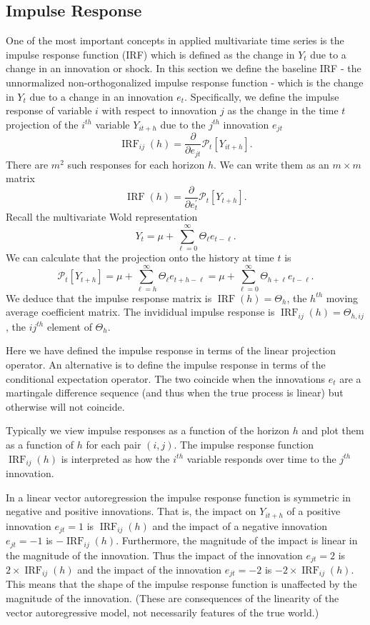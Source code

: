 \documentclass[10pt]{article}
\begin{document}
\subsection{Impulse Response}
One of the most important concepts in applied multivariate time series is the impulse response function (IRF) which is defined as the change in $Y_{t}$ due to a change in an innovation or shock. In this section we define the baseline IRF - the unnormalized non-orthogonalized impulse response function - which is the change in $Y_{t}$ due to a change in an innovation $e_{t}$. Specifically, we define the impulse response of variable $i$ with respect to innovation $j$ as the change in the time $t$ projection of the $i^{t h}$ variable $Y_{i t+h}$ due to the $j^{t h}$ innovation $e_{j t}$
$$
\operatorname{IRF}_{i j}(h)=\frac{\partial}{\partial e_{j t}} \mathscr{P}_{t}\left[Y_{i t+h}\right] .
$$
There are $m^{2}$ such responses for each horizon $h$. We can write them as an $m \times m$ matrix
$$
\operatorname{IRF}(h)=\frac{\partial}{\partial e_{t}^{\prime}} \mathscr{P}_{t}\left[Y_{t+h}\right] .
$$
Recall the multivariate Wold representation
$$
Y_{t}=\mu+\sum_{\ell=0}^{\infty} \Theta_{\ell} e_{t-\ell} .
$$
We can calculate that the projection onto the history at time $t$ is
$$
\mathscr{P}_{t}\left[Y_{t+h}\right]=\mu+\sum_{\ell=h}^{\infty} \Theta_{\ell} e_{t+h-\ell}=\mu+\sum_{\ell=0}^{\infty} \Theta_{h+\ell} e_{t-\ell} .
$$
We deduce that the impulse response matrix is $\operatorname{IRF}(h)=\Theta_{h}$, the $h^{t h}$ moving average coefficient matrix. The invididual impulse response is $\operatorname{IRF}_{i j}(h)=\Theta_{h, i j}$, the $i j^{t h}$ element of $\Theta_{h}$.

Here we have defined the impulse response in terms of the linear projection operator. An alternative is to define the impulse response in terms of the conditional expectation operator. The two coincide when the innovations $e_{t}$ are a martingale difference sequence (and thus when the true process is linear) but otherwise will not coincide.

Typically we view impulse responses as a function of the horizon $h$ and plot them as a function of $h$ for each pair $(i, j)$. The impulse response function $\operatorname{IRF}_{i j}(h)$ is interpreted as how the $i^{t h}$ variable responds over time to the $j^{t h}$ innovation.

In a linear vector autoregression the impulse response function is symmetric in negative and positive innovations. That is, the impact on $Y_{i t+h}$ of a positive innovation $e_{j t}=1$ is $\operatorname{IRF}_{i j}(h)$ and the impact of a negative innovation $e_{j t}=-1$ is $-\operatorname{IRF}_{i j}(h)$. Furthermore, the magnitude of the impact is linear in the magnitude of the innovation. Thus the impact of the innovation $e_{j t}=2$ is $2 \times \operatorname{IRF}_{i j}(h)$ and the impact of the innovation $e_{j t}=-2$ is $-2 \times \operatorname{IRF}_{i j}(h)$. This means that the shape of the impulse response function is unaffected by the magnitude of the innovation. (These are consequences of the linearity of the vector autoregressive model, not necessarily features of the true world.)
\end{document}
